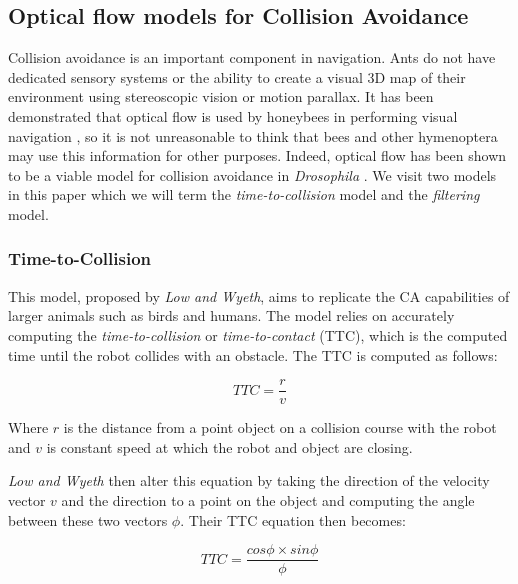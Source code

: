 \documentclass[a4paper,11pt,twoside,openright]{article}
\begin{document}
\subsection{ Optical flow models for Collision Avoidance } \label{sec:ofca}
Collision avoidance is an important component in navigation. Ants
do not have dedicated sensory systems or the ability to create a visual 3D map of their environment
using stereoscopic vision or motion parallax. It has been demonstrated that optical flow is used by
honeybees in performing visual navigation \cite{Dittmar2010}, so it is not unreasonable to
think that bees and other hymenoptera may use this information for other purposes. Indeed, optical
flow has been shown to be a viable model for collision avoidance in \textit{Drosophila}
\cite{Stewart2010}. We visit two models in this paper which we will term the
\textit{time-to-collision} model and the \textit{filtering} model.

\subsubsection{ Time-to-Collision }
This model, proposed by \textit{Low and Wyeth}\cite{Low2005}, aims to replicate the CA capabilities
of larger animals such as birds and humans. The model relies on accurately computing the
\textit{time-to-collision} or \textit{time-to-contact} (TTC), which is the computed time until the
robot collides with an obstacle. The TTC is computed as follows:

\begin{equation}
  \label{eqn:lowttc}
TTC = \frac{r}{v}
\end{equation}

Where $r$ is the distance from a point object on a collision course with the robot and $v$ is
constant speed at which the robot and object are closing.
\newline

\textit{Low and Wyeth} then alter this equation by taking the direction of the velocity vector $v$
and the direction to a point on the object and computing the angle between these two vectors $\phi$.
Their TTC equation then becomes:

\begin{equation}
 TTC = \frac{cos\phi \times sin\phi}{\phi}
\end{equation}
\end{document}
